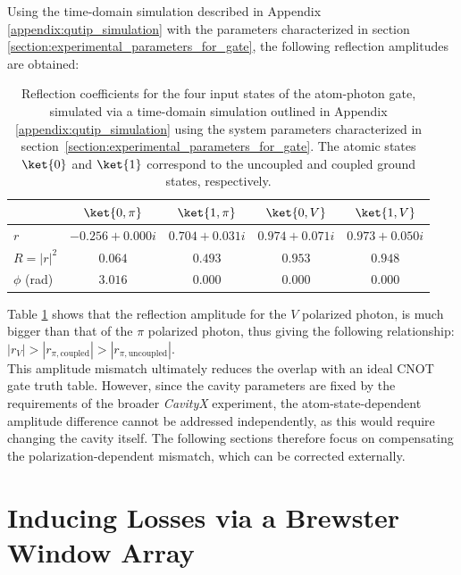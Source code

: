Using the time-domain simulation described in Appendix \ref{appendix:qutip_simulation} with the parameters characterized in section \ref{section:experimental_parameters_for_gate}, the following reflection amplitudes are obtained:

\begin{table}[ht]
	\centering
	\begin{tabular}{l|c|c|c|c}
		\hline\hline
		             & $\ket{0,\pi}$   & $\ket{1,\pi}$  & $\ket{0,V}$    & $\ket{1,V}$    \\
		\hline
		$r$          & $-0.256+0.000i$ & $0.704+0.031i$ & $0.974+0.071i$ & $0.973+0.050i$ \\[6pt]
		$R = |r|^2$  & $0.064$         & $0.493$        & $0.953$        & $0.948$        \\[6pt]
		$\phi$ (rad) & $3.016$         & $0.000$        & $0.000$        & $0.000$        \\
		\hline
	\end{tabular}
	\caption{Reflection coefficients for the four input states of the atom-photon gate, simulated via a time-domain simulation outlined in Appendix \ref{appendix:qutip_simulation} using the system parameters characterized in section~\ref{section:experimental_parameters_for_gate}. The atomic states $\ket{0}$ and $\ket{1}$ correspond to the uncoupled and coupled ground states, respectively.}
	\label{tab:reflection_coefficients}
\end{table}

Table \ref{tab:reflection_coefficients} shows that the reflection amplitude for the $V$ polarized photon, is much bigger than that of the $\pi$ polarized photon, thus giving the following relationship: $|r_{V}| >|r_{\pi,\text{coupled}}| >|r_{\pi,\text{uncoupled}}|$.\\

This amplitude mismatch ultimately reduces the overlap with an ideal CNOT gate truth table. However, since the cavity parameters are fixed by the requirements of the broader \textit{CavityX} experiment, the atom-state-dependent amplitude difference cannot be addressed independently, as this would require changing the cavity itself. The following sections therefore focus on compensating the polarization-dependent mismatch, which can be corrected externally.


\section{Inducing Losses via a Brewster Window Array}

